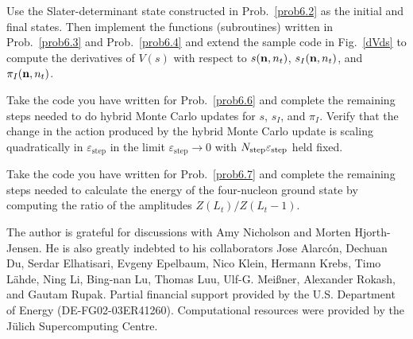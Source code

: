 \begin{prob}
\label{prob6.6}
Use the Slater-determinant state constructed in Prob.~\ref{prob6.2} as the initial and final
states.  Then implement the functions (subroutines) written in Prob.~\ref{prob6.3} and Prob.~\ref{prob6.4}
and extend the sample code in Fig.~\ref{dVds} to compute the derivatives of $V(s)$ with respect to $s({\bf n},n_t)$, $s_I({\bf n},n_t)$, and $\pi_I({\bf n},n_t)$.
\end{prob}

\begin{prob}
\label{prob6.7}
Take the code you have written for Prob.~\ref{prob6.6} and complete the remaining steps needed to do hybrid Monte Carlo updates for $s$, $s_I$, and $\pi_I$. Verify that the change in the action produced by the hybrid Monte Carlo update
is scaling quadratically in $\varepsilon_{\mathrm{step}}$ in the limit
$\varepsilon_{\mathrm{step}} \rightarrow 0$ with $N_{\rm step}\varepsilon_{\mathrm{step}}$
held fixed.
\end{prob}   

\begin{prob}
\label{prob6.8}
Take the code you have written for Prob.~\ref{prob6.7} and complete the remaining
steps needed to calculate the energy of the four-nucleon ground state by computing the ratio of the amplitudes $Z(L_t)/Z(L_t-1)$.
\end{prob}

\begin{acknowledgement}
The author is grateful for discussions with Amy Nicholson and Morten
Hjorth-Jensen.  He is also greatly indebted to his collaborators Jose
Alarc{\'o}n, Dechuan Du, Serdar Elhatisari, Evgeny Epelbaum, Nico
Klein, Hermann Krebs, Timo L{\"a}hde, Ning Li, Bing-nan Lu, Thomas
Luu, Ulf-G. Mei{\ss}ner, Alexander Rokash, and Gautam Rupak.  Partial
financial support provided by the U.S. Department of Energy
(DE-FG02-03ER41260).  Computational resources were provided by the
J\"{u}lich Supercomputing Centre.
\end{acknowledgement}







